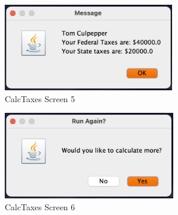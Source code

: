 \documentclass[\pandocDocMode,longtable, floatsintext, noextraspace]{apa6}
\begin{document}
\begin{figure}
\hypertarget{fig:screen5}{%
\centering
\includegraphics[width=\textwidth,height=1.5in]{media/CSC310-Case1-5.png}
\caption{CalcTaxes Screen 5}\label{fig:screen5}
}
\end{figure}

\begin{figure}
\hypertarget{fig:screen6}{%
\centering
\includegraphics[width=\textwidth,height=1.5in]{media/CSC310-Case1-6.png}
\caption{CalcTaxes Screen 6}\label{fig:screen6}
}
\end{figure}
\end{document}
